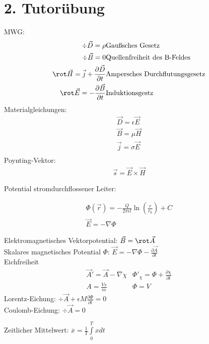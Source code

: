\documentclass[]{article}
\begin{document}
\section*{2. Tutorübung}
MWG: 
\begin{eqnarray}
\div \vec D = \rho &  \text{Gaußsches Gesetz} \\
\div \vec B = 0 & \text{Quellenfreiheit des B-Feldes} \\
\rot \vec H = \vec j + \frac{\partial \vec D}{\partial t} & \text{Ampersches Durchflutungsgesetz} \\
\rot \vec E = - \frac{\partial \vec B}{\partial t} & \text{Induktionsgestz}
\end{eqnarray}
Materialgleichungen: 
\begin{eqnarray}
\vec D = \epsilon \vec E \\
\vec B = \mu \vec H \\
\vec j = \sigma \vec E \\
\end{eqnarray}
Poynting-Vektor:
\begin{eqnarray}
\vec s = \vec E \times \vec H
\end{eqnarray}

Potential stromdurchflossener Leiter:

\begin{eqnarray}
\Phi (\vec r) = - \frac{Q}{2 \pi \epsilon l} \ln (\frac{r}{r_0}) + C \\
\vec E = - \nabla \Phi
\end{eqnarray}

Elektromagnetisches Vektorpotential: $\vec B = \rot \vec A$ \\
Skalares magnetisches Potential $\Phi$: $\vec E = - \nabla \Phi - \frac{\partial \vec A}{\partial t}$
\\
Eichfreiheit
\begin{eqnarray}
\vec A' = \vec A - \nabla \chi & \Phi'_\chi = \Phi + \frac{\partial \chi}{\partial t} \\
A = \frac{Vs}{m} & \Phi = V
\end{eqnarray}
Lorentz-Eichung: $\div \vec A + \epsilon M \frac{\partial \Phi}{\partial t} = 0$ \\
Coulomb-Eichung:  $\div \vec A = 0$

Zeitlicher Mittelwert: $ \overline{x} = \frac{1}{T} \int \limits_0^T x dt$
\end{document}
